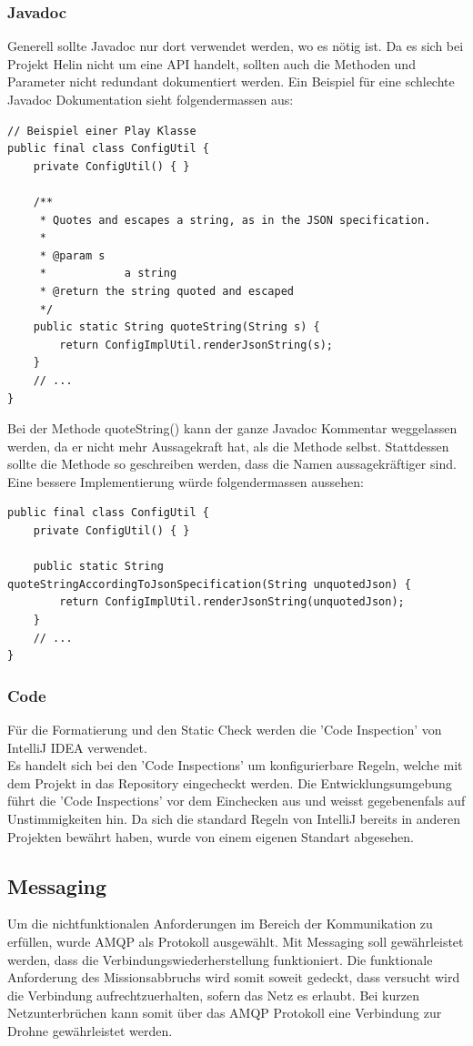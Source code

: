 \subsubsection{Javadoc}
Generell sollte Javadoc nur dort verwendet werden, wo es nötig ist. Da es sich bei Projekt Helin nicht um eine API handelt, sollten auch die Methoden und Parameter nicht redundant dokumentiert werden. Ein Beispiel für eine schlechte Javadoc Dokumentation sieht folgendermassen aus:
\begin{lstlisting}
// Beispiel einer Play Klasse
public final class ConfigUtil {
    private ConfigUtil() { }

    /**
     * Quotes and escapes a string, as in the JSON specification.
     *
     * @param s
     *            a string
     * @return the string quoted and escaped
     */
    public static String quoteString(String s) {
        return ConfigImplUtil.renderJsonString(s);
    }
    // ...
}
\end{lstlisting}
Bei der Methode quoteString() kann der ganze Javadoc Kommentar weggelassen werden, da er nicht mehr Aussagekraft hat, als die Methode selbst. Stattdessen sollte die Methode so geschreiben werden, dass die Namen aussagekräftiger sind.
\\
Eine bessere Implementierung würde folgendermassen aussehen:
\begin{lstlisting}
public final class ConfigUtil {
    private ConfigUtil() { }

    public static String quoteStringAccordingToJsonSpecification(String unquotedJson) {
        return ConfigImplUtil.renderJsonString(unquotedJson);
    }
    // ...
}
\end{lstlisting}
\subsubsection{Code}
Für die Formatierung und den Static Check werden die 'Code Inspection' von IntelliJ IDEA verwendet.
\\
Es handelt sich bei den 'Code Inspections' um konfigurierbare Regeln, welche mit dem Projekt in das Repository eingecheckt werden. Die Entwicklungsumgebung führt die 'Code Inspections' vor dem Einchecken aus und weisst gegebenenfals auf Unstimmigkeiten hin.
Da sich die standard Regeln von IntelliJ bereits in anderen Projekten bewährt haben, wurde von einem eigenen Standart abgesehen.
\newpage
\subsection{Messaging}
Um die nichtfunktionalen Anforderungen im Bereich der Kommunikation zu erfüllen, wurde AMQP als Protokoll ausgewählt. Mit Messaging soll gewährleistet werden, dass die Verbindungswiederherstellung funktioniert. Die funktionale Anforderung des Missionsabbruchs wird somit soweit gedeckt, dass versucht wird die Verbindung aufrechtzuerhalten, sofern das Netz es erlaubt. Bei kurzen Netzunterbrüchen kann somit über das AMQP Protokoll eine Verbindung zur Drohne gewährleistet werden.

